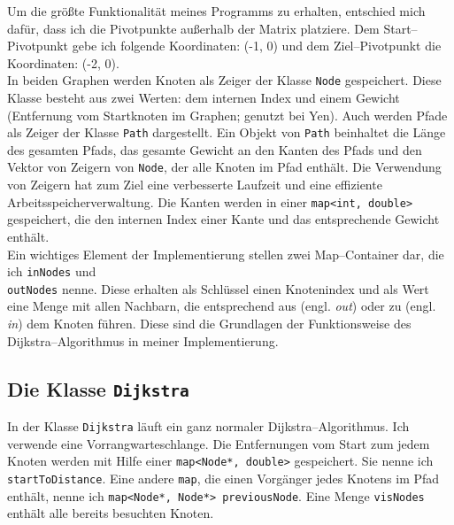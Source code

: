 \documentclass[a4paper,10pt,ngerman]{scrartcl}
\begin{document}
Um die größte Funktionalität meines Programms zu erhalten, entschied mich dafür, dass ich
die Pivotpunkte außerhalb der Matrix platziere. 
Dem Start--Pivotpunkt gebe ich folgende Koordinaten: (-1, 0) und dem Ziel--Pivotpunkt
die Koordinaten: (-2, 0).\\

In beiden Graphen werden Knoten als Zeiger der Klasse \texttt{Node} gespeichert.
Diese Klasse besteht aus zwei Werten: dem internen Index und einem Gewicht (Entfernung vom Startknoten im Graphen;
genutzt bei Yen).
Auch werden Pfade als Zeiger der Klasse \texttt{Path} dargestellt. Ein Objekt von \texttt{Path} beinhaltet
die Länge des gesamten Pfads, das gesamte Gewicht an den Kanten des Pfads und den Vektor von Zeigern von \texttt{Node}, 
der alle Knoten im Pfad enthält. Die Verwendung von Zeigern hat zum Ziel eine verbesserte Laufzeit und eine effiziente 
Arbeitsspeicherverwaltung. Die Kanten werden in einer \texttt{map<int, double>} gespeichert, die den internen Index
einer Kante und das entsprechende Gewicht enthält.\\
Ein wichtiges Element der Implementierung stellen zwei Map--Container dar,
die ich \texttt{inNodes} und \\\texttt{outNodes} nenne.
Diese erhalten als Schlüssel einen Knotenindex und als Wert eine Menge mit allen Nachbarn, die entsprechend 
aus (engl. \textit{out}) oder zu (engl. \textit{in}) dem Knoten führen.
Diese sind die Grundlagen der Funktionsweise des Dijkstra–Algorithmus in meiner Implementierung.

\subsection{Die Klasse \texttt{Dijkstra}}

In der Klasse \texttt{Dijkstra} läuft ein ganz normaler Dijkstra–Algorithmus.
Ich verwende eine Vorrangwarteschlange. Die Entfernungen vom Start zum jedem Knoten werden mit Hilfe
einer \texttt{map<Node*, double>} gespeichert. Sie nenne ich \texttt{startToDistance}.
Eine andere \texttt{map}, die einen Vorgänger jedes Knotens im Pfad enthält, nenne ich
\texttt{map<Node*, Node*> previousNode}. Eine Menge \texttt{visNodes} enthält alle bereits besuchten Knoten.\\
\end{document}
